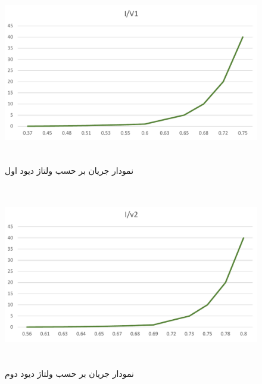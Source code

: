 \documentclass[12pt]{article}
\begin{document}
\begin{figure}[H]
	\begin{center}
		\includegraphics[width=\textwidth, height=8cm]{./images/7.5}
	\end{center}
\caption{نمودار جریان بر حسب ولتاژ دیود اول}
\end{figure}


\begin{figure}[H]
	\begin{center}
		\includegraphics[width=\textwidth, height=8cm]{./images/7.6}
	\end{center}
\caption{نمودار جریان بر حسب ولتاژ دیود دوم}
\end{figure}
\end{document}
